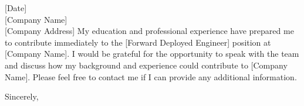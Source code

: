 \documentclass[a4paper,11pt]{letter}
\begin{document}
\begin{letter}{[Date] \\{} 
[Company Name] \\{} 
[Company Address]}
\noindent My education and professional experience have prepared me to contribute immediately to the [Forward Deployed Engineer] position at [Company Name]. I would be grateful for the opportunity to speak with the team and discuss how my background and experience could contribute to [Company Name]. Please feel free to contact me if I can provide any additional information.

\closing{Sincerely,}

\end{letter}
\end{document}
